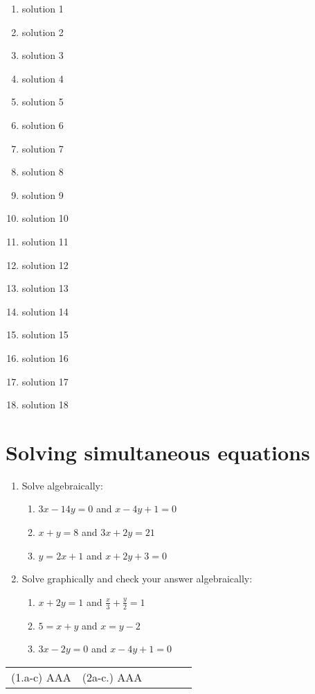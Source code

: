  \begin{solutions}{}{
\begin{enumerate}[itemsep=5pt, label=\textbf{\arabic*}. ] 


\item solution 1
\item solution 2
\item solution 3
\item solution 4
\item solution 5
\item solution 6
\item solution 7
\item solution 8
\item solution 9
\item solution 10
\item solution 11
\item solution 12
\item solution 13
\item solution 14
\item solution 15
\item solution 16
\item solution 17
\item solution 18

\end{enumerate}}
\end{solutions}


\section{Solving simultaneous equations}
\begin{exercises}{}
{
\begin{enumerate}[noitemsep, label=\textbf{\arabic*}. ] 
\item Solve algebraically: 
\begin{enumerate}[noitemsep, label=\textbf{(\alph*)} ] 
\item $3x-14y=0$ and $x-4y+1=0$
\item $x+y=8$ and $3x + 2y = 21$
\item $y=2x+1$ and $x + 2y + 3 = 0$
\end{enumerate}
\item Solve graphically and check your answer algebraically:
\begin{enumerate}[noitemsep, label=\textbf{(\alph*)} ] 
\item  $x+2y=1$ and $\frac{x}{3} + \frac{y}{2} = 1$
\item $5= x+y$ and $x = y-2$
\item $3x - 2y = 0$ and $x - 4y + 1 = 0$
\end{enumerate}
\end{enumerate}
\practiceinfo
\par 
\par \begin{tabular}[h]{cccccc}
(1.a-c) AAA &  (2a-c.) AAA
& \end{tabular}
}
\end{exercises}


